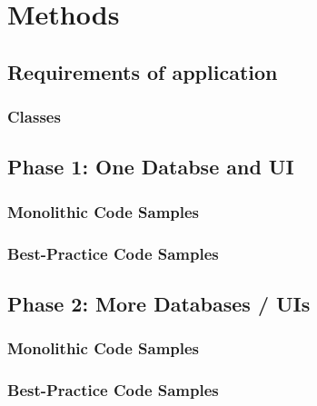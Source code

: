 \chapter{Methods}

\section{Requirements of application}
\subsection{Classes}

\section{Phase 1: One Databse and UI}
\subsection{Monolithic Code Samples}

\subsection{Best-Practice Code Samples}

\section{Phase 2: More Databases / UIs}

\subsection{Monolithic Code Samples}

\subsection{Best-Practice Code Samples}
